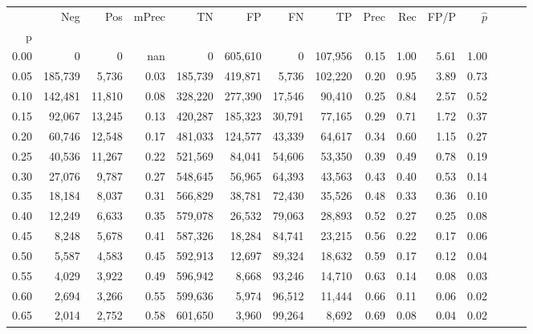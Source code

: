 \begin{tabular}{rrrrrrrrrrrrrrr}
\toprule
{} &      Neg &     Pos & mPrec &       TN &       FP &       FN &       TP &  Prec &   Rec &  FP/P & $\hat{p}$ \\
p    &          &         &       &          &          &          &          &       &       &       &           \\
\midrule
0.00 &        0 &       0 &   nan &        0 &  605,610 &        0 &  107,956 &  0.15 &  1.00 &  5.61 &      1.00 \\
0.05 &  185,739 &   5,736 &  0.03 &  185,739 &  419,871 &    5,736 &  102,220 &  0.20 &  0.95 &  3.89 &      0.73 \\
0.10 &  142,481 &  11,810 &  0.08 &  328,220 &  277,390 &   17,546 &   90,410 &  0.25 &  0.84 &  2.57 &      0.52 \\
0.15 &   92,067 &  13,245 &  0.13 &  420,287 &  185,323 &   30,791 &   77,165 &  0.29 &  0.71 &  1.72 &      0.37 \\
0.20 &   60,746 &  12,548 &  0.17 &  481,033 &  124,577 &   43,339 &   64,617 &  0.34 &  0.60 &  1.15 &      0.27 \\
0.25 &   40,536 &  11,267 &  0.22 &  521,569 &   84,041 &   54,606 &   53,350 &  0.39 &  0.49 &  0.78 &      0.19 \\
0.30 &   27,076 &   9,787 &  0.27 &  548,645 &   56,965 &   64,393 &   43,563 &  0.43 &  0.40 &  0.53 &      0.14 \\
0.35 &   18,184 &   8,037 &  0.31 &  566,829 &   38,781 &   72,430 &   35,526 &  0.48 &  0.33 &  0.36 &      0.10 \\
0.40 &   12,249 &   6,633 &  0.35 &  579,078 &   26,532 &   79,063 &   28,893 &  0.52 &  0.27 &  0.25 &      0.08 \\
0.45 &    8,248 &   5,678 &  0.41 &  587,326 &   18,284 &   84,741 &   23,215 &  0.56 &  0.22 &  0.17 &      0.06 \\
0.50 &    5,587 &   4,583 &  0.45 &  592,913 &   12,697 &   89,324 &   18,632 &  0.59 &  0.17 &  0.12 &      0.04 \\
0.55 &    4,029 &   3,922 &  0.49 &  596,942 &    8,668 &   93,246 &   14,710 &  0.63 &  0.14 &  0.08 &      0.03 \\
0.60 &    2,694 &   3,266 &  0.55 &  599,636 &    5,974 &   96,512 &   11,444 &  0.66 &  0.11 &  0.06 &      0.02 \\
0.65 &    2,014 &   2,752 &  0.58 &  601,650 &    3,960 &   99,264 &    8,692 &  0.69 &  0.08 &  0.04 &      0.02 \\

\end{tabular}
